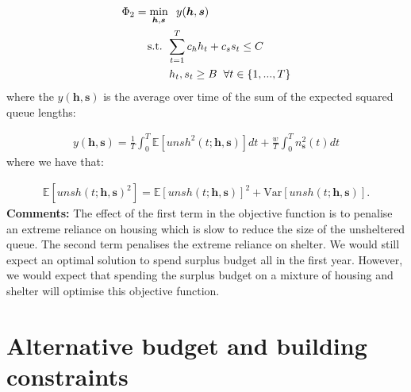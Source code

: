\documentclass{article}
\begin{document}
\begin{align*}
        & \Phi_2 = \min_{\boldsymbol{h},\boldsymbol{s}} \hspace{0.2cm} y(\boldsymbol{h},\boldsymbol{s}) \\
        & \hspace{0.7cm} \text{ s.t. } \sum_{t=1}^{T} c_{h}h_{t} + c_{s}s_{t} \leq C \\
        & \hspace{1.5cm} h_t, s_t \geq B \hspace{0.2cm} \forall t \in \{1, ..., T\}
\end{align*}
%
where the $y(\boldsymbol{h},\boldsymbol{s})$ is the average over time of the sum of the expected squared queue lengths:

\begin{align*}
  y(\boldsymbol{h},\boldsymbol{s}) = \frac{1}{T} \int_0^T \mathbb{E}[unsh^2(t; \boldsymbol{h},\boldsymbol{s})] dt + \frac{w}{T} \int_0^T n_{\boldsymbol{s}}^2(t) dt
\end{align*}
%
where we have that:
 
\begin{align*}
  \mathbb{E}[unsh(t; \boldsymbol{h},\boldsymbol{s})^2] = \mathbb{E}[unsh(t; \boldsymbol{h},\boldsymbol{s})]^2 + \text{Var}[unsh(t; \boldsymbol{h},\boldsymbol{s})].
\end{align*}
%
\textbf{Comments:} The effect of the first term in the objective function is to penalise an extreme reliance on housing which is slow to reduce the size of the unsheltered queue. The second term penalises the extreme reliance on shelter. We would still expect an optimal solution to spend surplus budget all in the first year. However, we would expect that spending the surplus budget on a mixture of housing and shelter will optimise this objective function. 
%
\newpage

\section{Alternative budget and building constraints}
\end{document}
